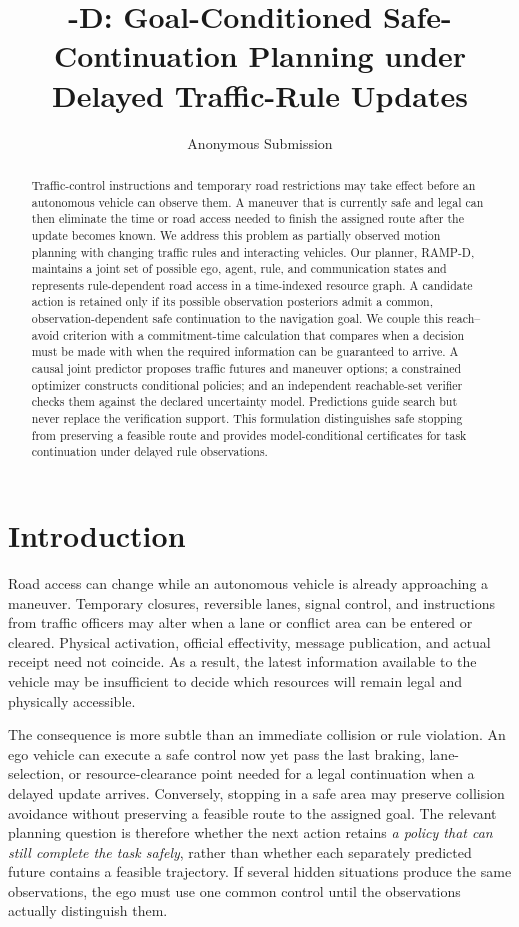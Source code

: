 \documentclass[letterpaper]{article} %
\title{\RAMP-D: Goal-Conditioned Safe-Continuation Planning under Delayed Traffic-Rule Updates}
\author{Anonymous Submission}
\date{}
\newcommand{\RAMP}{\textsc{RAMP}}
\begin{document}
\maketitle

\begin{abstract}
Traffic-control instructions and temporary road restrictions may take effect before an autonomous vehicle can observe them. A maneuver that is currently safe and legal can then eliminate the time or road access needed to finish the assigned route after the update becomes known. We address this problem as partially observed motion planning with changing traffic rules and interacting vehicles. Our planner, \RAMP-D, maintains a joint set of possible ego, agent, rule, and communication states and represents rule-dependent road access in a time-indexed resource graph. A candidate action is retained only if its possible observation posteriors admit a common, observation-dependent safe continuation to the navigation goal. We couple this reach--avoid criterion with a commitment-time calculation that compares when a decision must be made with when the required information can be guaranteed to arrive. A causal joint predictor proposes traffic futures and maneuver options; a constrained optimizer constructs conditional policies; and an independent reachable-set verifier checks them against the declared uncertainty model. Predictions guide search but never replace the verification support. This formulation distinguishes safe stopping from preserving a feasible route and provides model-conditional certificates for task continuation under delayed rule observations.
\end{abstract}

\section{Introduction}
Road access can change while an autonomous vehicle is already approaching a maneuver. Temporary closures, reversible lanes, signal control, and instructions from traffic officers may alter when a lane or conflict area can be entered or cleared. Physical activation, official effectivity, message publication, and actual receipt need not coincide. As a result, the latest information available to the vehicle may be insufficient to decide which resources will remain legal and physically accessible.

The consequence is more subtle than an immediate collision or rule violation. An ego vehicle can execute a safe control now yet pass the last braking, lane-selection, or resource-clearance point needed for a legal continuation when a delayed update arrives. Conversely, stopping in a safe area may preserve collision avoidance without preserving a feasible route to the assigned goal. The relevant planning question is therefore whether the next action retains \emph{a policy that can still complete the task safely}, rather than whether each separately predicted future contains a feasible trajectory. If several hidden situations produce the same observations, the ego must use one common control until the observations actually distinguish them.
\end{document}
